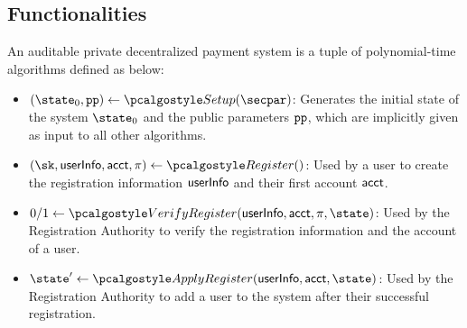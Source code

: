 \subsection{Functionalities}
An auditable private decentralized payment system is a tuple of polynomial-time algorithms defined as below:

\begin{itemize}
    \item $(\instate, \params) \gets \setup(\secpar)$: 
    Generates the initial state of the system $\instate$ and the public parameters $\textup{\texttt{{pp}}}$, which are implicitly given as input to all other algorithms.

    \item $(\sk, \userinfo, \acct, \pi) \gets \reg()$: 
    Used by a user to create the registration information $\textup{\textsf{userInfo}}$ and their first account $\textup{\textsf{acct}}$.
    

    \item $0/1 \gets \verreg(\userinfo, \acct, \pi, \state)$: 
        Used by the Registration Authority to verify the registration information and the account of a user.

    \item $\state' \gets \applyreg(\userinfo, \acct, \state)$:
        Used by the Registration Authority to add a user to the system after their successful registration.
    

\end{itemize}

